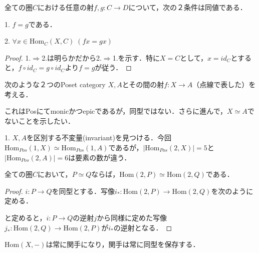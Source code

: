 \documentclass[uplatex, 12pt, dvipdfmx]{jsarticle}
\begin{document}
\begin{proposition*}
    全ての圏$C$における任意の射$f,g:C\to D$について，次の２条件は同値である．
    
    1. $f=g$である．

    2. $\forall x\in\mathrm{Hom}_C(X,C)\; (fx=gx)$
\end{proposition*}
\begin{proof}
    1.$\Rightarrow$2.は明らかだから2.$\Rightarrow$1.を示す．特に$X=C$として，$x=id_C$とすると，$f\circ id_C=g\circ id_C$より$f=g$が従う．
\end{proof}

\begin{example}\label{example-generalized-elements}
    次のような２つのPoset category $X,A$とその間の射$f:X\to A$（点線で表した）を考える．
    \begin{center}
    \end{center}
    これはPosにてmonicかつepicであるが，同型ではない．さらに進んで，$X\simeq A$でないことを示したい．

    1. $X,A$を区別する不変量(invariant)を見つける．今回$\mathrm{Hom}_{Pos}(1,X)\simeq\mathrm{Hom}_{Pos}(1,A)$であるが，$|\mathrm{Hom}_{Pos}(2,X)|=5$と$|\mathrm{Hom}_{Pos}(2,A)|=6$は要素の数が違う．
    \begin{proposition*}
        全ての圏$C$において，$P\simeq Q$ならば，$\mathrm{Hom}(2,P)\simeq\mathrm{Hom}(2,Q)$である．
    \end{proposition*}
    \begin{proof}
        $i:P\to Q$を同型とする．写像$i_*:\mathrm{Hom}(2,P)\to\mathrm{Hom}(2,Q)$を次のように定める．
        \begin{center}
        \end{center}
        と定めると，$i:P\to Q$の逆射$j$から同様に定めた写像$j_*:\mathrm{Hom}(2,Q)\to\mathrm{Hom}(2,P)$が$i_*$の逆射となる．
    \end{proof}
    \begin{remark*}
        $\mathrm{Hom}(X,-)$は常に関手になり，関手は常に同型を保存する．
    \end{remark*}
\end{example}
\end{document}

